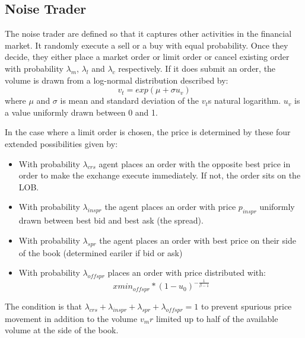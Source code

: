 \subsection{Noise Trader} 
The noise trader are defined so that it captures other activities in the financial market. It randomly execute a sell or a buy with equal probability. Once they decide, they either place a market order or limit order or cancel existing order with probability $\lambda_{m}$, $\lambda_{l}$ and $\lambda_{c}$ respectively. If it does submit an order, the volume is drawn from a log-normal distribution described by:
\[ v_t = exp(\mu + \sigma u_v) \]
where $\mu$ and $\sigma$ is mean and standard deviation of the $v_t$s natural logarithm. $u_v$ is a value uniformly drawn between 0 and 1. 

In the case where a limit order is chosen, the price is determined by these four extended possibilities given by: 
\begin{itemize}
  \item With probability $\lambda_{crs}$ agent places an order with the opposite best price in order to make the exchange execute immediately. If not, the order sits on the LOB. 
  \item With probability $\lambda_{inspr}$ the agent places an order with price $p_{inspr}$ uniformly drawn between best bid and best ask (the spread). 
  \item With probability $\lambda_{spr}$ the agent places an order with best price on their side of the book (determined eariler if bid or ask)
  \item With probability $\lambda_{offspr}$ places an order with price distributed with:  
  \[ xmin_{offspr} * (1-u_0)^{-\frac{1}{\beta - 1}} \]
\end{itemize}
The condition is that $\lambda_{crs} + \lambda_{inspr} + \lambda_{spr} + \lambda_{offspr} = 1$ to prevent spurious price movement in addition to the volume $v_mr$ limited up to half of the available volume at the side of the book. 

